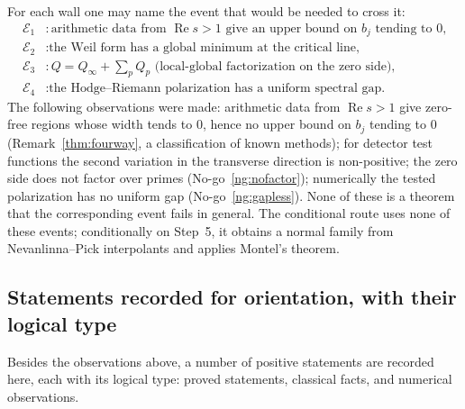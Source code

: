 \documentclass[11pt]{amsart}
\theoremstyle{definition}
\theoremstyle{remark}
\theoremstyle{definition}
\renewcommand{\Re}{\operatorname{Re}}
\begin{document}
For each wall one may name the event that would be needed to cross it:
\begin{align*}
   \mathcal E_1 &: \text{arithmetic data from }\Re s>1\text{ give an upper bound on }b_j\text{ tending to }0\text{,}\\
   \mathcal E_2 &: \text{the Weil form has a global minimum at the critical line,}\\
   \mathcal E_3 &: Q=Q_\infty+\sum_p Q_p\text{ (local-global factorization on the zero side),}\\
   \mathcal E_4 &: \text{the Hodge--Riemann polarization has a uniform spectral gap.}
\end{align*}
The following observations were made: arithmetic data from
$\Re s>1$ give zero-free regions whose width tends to $0$, hence no upper bound on $b_j$ tending to
$0$ (Remark~\ref{thm:fourway}, a
classification of known methods); for detector test functions the second variation in the transverse
direction is non-positive; the zero side does not factor over primes (No-go~\ref{ng:nofactor});
numerically the tested polarization has no uniform gap (No-go~\ref{ng:gapless}). None of these is a
theorem that the corresponding event fails in general. The conditional route uses none of these events;
conditionally on Step~5, it obtains a normal family from Nevanlinna--Pick interpolants and applies
Montel's theorem.

\subsection{Statements recorded for orientation, with their logical type}\label{sec:positive}

Besides the observations above, a number of positive statements are recorded here, each with its logical
type: proved statements, classical facts, and numerical observations.
\end{document}
